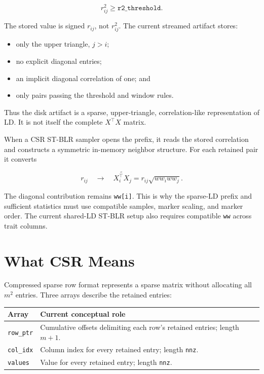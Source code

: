 \documentclass[
  11pt,
  letterpaper,
  DIV=11,
  numbers=noendperiod]{scrartcl}
\providecommand{\tightlist}{%
  \setlength{\itemsep}{0pt}\setlength{\parskip}{0pt}}
\begin{document}
\[
r_{ij}^2 \geq \texttt{r2_threshold}.
\]

The stored value is signed \(r_{ij}\), not \(r_{ij}^2\). The current
streamed artifact stores:

\begin{itemize}
\tightlist
\item
  only the upper triangle, \(j>i\);
\item
  no explicit diagonal entries;
\item
  an implicit diagonal correlation of one; and
\item
  only pairs passing the threshold and window rules.
\end{itemize}

Thus the disk artifact is a sparse, upper-triangle, correlation-like
representation of LD. It is not itself the complete \(X^\top X\) matrix.

When a CSR ST-BLR sampler opens the prefix, it reads the stored
correlation and constructs a symmetric in-memory neighbor structure. For
each retained pair it converts

\[
r_{ij}
\quad\longrightarrow\quad
\widetilde{X_i^\top X_j}
=
r_{ij}\sqrt{ww_iww_j}.
\]

The diagonal contribution remains \texttt{ww{[}i{]}}. This is why the
sparse-LD prefix and sufficient statistics must use compatible samples,
marker scaling, and marker order. The current shared-LD ST-BLR setup
also requires compatible \texttt{ww} across trait columns.

\section{What CSR Means}\label{what-csr-means}

Compressed sparse row format represents a sparse matrix without
allocating all \(m^2\) entries. Three arrays describe the retained
entries:

\begin{longtable}[]{@{}
  >{\raggedright\arraybackslash}p{}
  >{\raggedright\arraybackslash}p{}@{}}
\toprule\noalign{}
\begin{minipage}[b]{\linewidth}\raggedright
Array
\end{minipage} & \begin{minipage}[b]{\linewidth}\raggedright
Current conceptual role
\end{minipage} \\
\midrule\noalign{}
\endhead
\bottomrule\noalign{}
\endlastfoot
\texttt{row\_ptr} & Cumulative offsets delimiting each row's retained
entries; length \(m+1\). \\
\texttt{col\_idx} & Column index for every retained entry; length
\texttt{nnz}. \\
\texttt{values} & Value for every retained entry; length
\texttt{nnz}. \\
\end{longtable}
\end{document}
